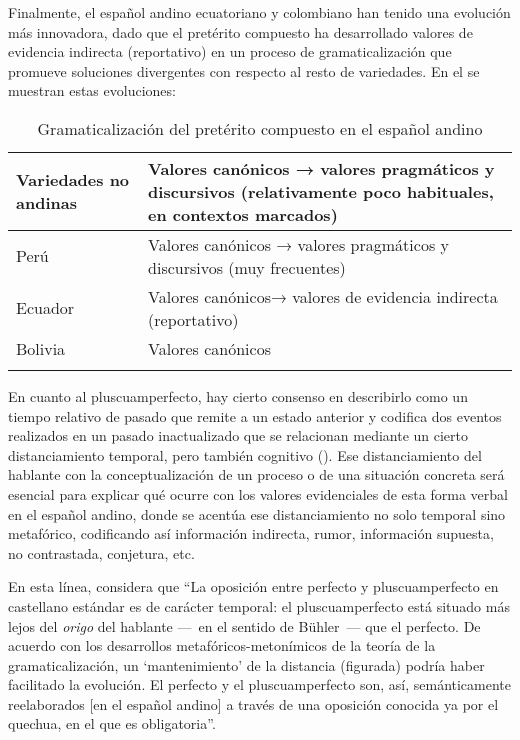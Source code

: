 \documentclass[output=paper]{../langscibook}
\begin{document}
  Finalmente, el español andino ecuatoriano y colombiano han tenido una evolución más innovadora, dado que el pretérito compuesto ha desarrollado valores de evidencia indirecta (reportativo) en un proceso de gramaticalización que promueve soluciones divergentes con respecto al resto de variedades. En el  se muestran estas evoluciones:

\begin{table}
\caption{\label{tab:palacios:2} Gramaticalización del pretérito compuesto en el español andino}

\begin{tabularx}{\textwidth}{lQ}
\lsptoprule
Variedades no andinas & Valores canónicos\footnotemark{} → valores pragmáticos y discursivos (relativamente poco habituales, en contextos marcados)\\
\midrule
Perú & Valores canónicos → valores pragmáticos y discursivos (muy frecuentes)\\
Ecuador & Valores canónicos→ valores de evidencia indirecta (reportativo)\\
Bolivia & Valores canónicos \\
\lspbottomrule
\end{tabularx}
\end{table}

En cuanto al pluscuamperfecto, hay cierto consenso en describirlo como un tiempo relativo de pasado que remite a un estado anterior y codifica dos eventos realizados en un pasado inactualizado que se relacionan mediante  un cierto distanciamiento temporal, pero también cognitivo (\citealt{Bermúdez2011,Pfänder2009,SotoHasler2013,SotoOlguín2010,Söhrman2013}). Ese distanciamiento del hablante con la conceptualización de un proceso o de una situación concreta será esencial para explicar qué ocurre con los valores evidenciales de esta forma verbal en el español andino, donde se acentúa ese distanciamiento no solo temporal sino metafórico, codificando así información indirecta, rumor, información supuesta, no contrastada, conjetura, etc.

En esta línea, \citet[230]{Pfänder2009} considera que “La oposición entre perfecto y pluscuamperfecto en castellano estándar es de carácter temporal: el pluscuamperfecto está situado más lejos del \textit{origo} del hablante –– en el sentido de Bühler –– que el perfecto. De acuerdo con los desarrollos metafóricos-metonímicos de la teoría de la gramaticalización, un ‘mantenimiento’ de la distancia (figurada) podría haber facilitado la evolución. El perfecto y el pluscuamperfecto son, así, semánticamente reelaborados [en el español andino] a través de una oposición conocida ya por el quechua, en el que es obligatoria”.
\end{document}
